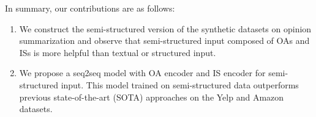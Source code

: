 In summary, our contributions are as follows:
\begin{enumerate}
\item We construct the semi-structured version of the synthetic datasets on opinion summarization and observe that semi-structured input composed of OAs and ISs is more helpful than textual or structured input.

\item 
We propose a seq2seq model with OA encoder and IS encoder for semi-structured input.
This model trained on semi-structured data outperforms previous  
state-of-the-art (SOTA) approaches on the Yelp and Amazon datasets.
\end{enumerate}
